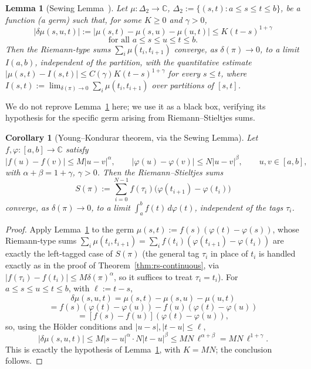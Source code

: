\documentclass[11pt,fleqn]{article}
\def\C{\mathbb C}
\theoremstyle{plain}
\newtheorem{lemma}[thm]{Lemma}
\newtheorem{cor}[thm]{Corollary}
\theoremstyle{remark}
\begin{document}
\begin{lemma}[Sewing Lemma~\cite{FdlP}]\label{lem:sewing}
Let $\mu\colon\Delta_2\to\C$, $\Delta_2:=\{(s,t):a\le s\le t\le b\}$, be a
function (a \emph{germ}) such that, for some $K\ge0$ and $\gamma>0$,
\[
|\delta\mu(s,u,t)|:=|\mu(s,t)-\mu(s,u)-\mu(u,t)|\le K(t-s)^{1+\gamma}
\]
\[
\text{for all }a\le s\le u\le t\le b.
\]
Then the Riemann-type sums $\sum_i\mu(t_i,t_{i+1})$ converge, as
$\delta(\pi)\to0$, to a limit $I(a,b)$, independent of the partition,
with the quantitative estimate
$|\mu(s,t)-I(s,t)|\le C(\gamma)K(t-s)^{1+\gamma}$
for every $s\le t$, where $I(s,t):=\lim_{\delta(\pi)\to0}\sum_i\mu(t_i,t_{i+1})$
over partitions of $[s,t]$.
\end{lemma}

We do not reprove Lemma~\ref{lem:sewing} here; we use it as a black box,
verifying its hypothesis for the specific germ arising from
Riemann--Stieltjes sums.

\begin{cor}[Young--Kondurar theorem, via the Sewing Lemma]\label{thm:kondurar}
Let $f,\varphi\colon[a,b]\to\C$ satisfy
\[
|f(u)-f(v)|\le M|u-v|^\alpha,\qquad |\varphi(u)-\varphi(v)|\le N|u-v|^\beta,
\qquad u,v\in[a,b],
\]
with $\alpha+\beta=1+\gamma$, $\gamma>0$. Then the Riemann--Stieltjes sums
\[
S(\pi):=\sum_{i=0}^{N-1}f(\tau_i)\big(\varphi(t_{i+1})-\varphi(t_i)\big)
\]
converge, as $\delta(\pi)\to0$, to a limit
$\int_a^bf(t)\,d\varphi(t)$, independent of the tags $\tau_i$.
\end{cor}
\begin{proof}
Apply Lemma~\ref{lem:sewing} to the germ $\mu(s,t):=f(s)(\varphi(t)-\varphi(s))$,
whose Riemann-type sums $\sum_i\mu(t_i,t_{i+1})=\sum_if(t_i)(\varphi(t_{i+1})-\varphi(t_i))$
are exactly the left-tagged case of $S(\pi)$ (the general tag $\tau_i$
in place of $t_i$ is handled exactly as in the proof of
Theorem~\ref{thm:rs-continuous}, via $|f(\tau_i)-f(t_i)|\le M\delta(\pi)^\alpha$,
so it suffices to treat $\tau_i=t_i$). For $a\le s\le u\le t\le b$, with
$\ell:=t-s$,
\[
\delta\mu(s,u,t)=\mu(s,t)-\mu(s,u)-\mu(u,t)
\]
\[
=f(s)(\varphi(t)-\varphi(u))-f(u)(\varphi(t)-\varphi(u))
\]
\[
=[f(s)-f(u)](\varphi(t)-\varphi(u)),
\]
so, using the H\"older conditions and $|u-s|,|t-u|\le\ell$,
\[
|\delta\mu(s,u,t)|\le M|s-u|^\alpha\cdot N|t-u|^\beta\le MN\,\ell^{\alpha+\beta}
=MN\,\ell^{1+\gamma}.
\]
This is exactly the hypothesis of Lemma~\ref{lem:sewing}, with $K=MN$;
the conclusion follows.
\end{proof}
\end{document}

